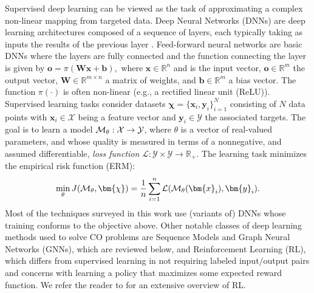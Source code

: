 Supervised deep learning can be viewed as the task of
approximating a complex non-linear mapping from targeted data. Deep
Neural Networks (DNNs) are deep learning architectures composed of a
sequence of layers, each typically taking as inputs the results of the previous layer . Feed-forward neural networks are basic DNNs where the layers are fully connected and the function connecting the layer is given by
\(
    \bm{o} = \pi(\bm{W} \bm{x} + \bm{b}),
\)
where $\bm{x} \!\in\! \mathbb{R}^n$ and is the input vector, 
$\bm{o} \!\in\! \mathbb{R}^m$ the output vector, $\bm{W} \!\in\! 
\mathbb{R}^{m \times n}$ a matrix of weights, and $\bm{b} \!\in\! 
\mathbb{R}^m$ a bias vector. The function $\pi(\cdot)$ is
often non-linear (e.g., a rectified linear unit (ReLU)).
Supervised learning tasks consider datasets $\bm{\chi}\!=\!\{\bm{x}_i, \bm{y}_i\}_{i=1}^N$ consisting of $N$ data points with $\bm{x}_i \in \mathcal{X}$ being a feature vector and $\bm{y}_i \in \mathcal{Y}$ the associated targets. The goal is to learn a model ${\cal M}_\theta : \mathcal{X} \to \mathcal{Y}$, where $\theta$ is a vector of real-valued parameters, and whose quality is measured in terms of a nonnegative, and assumed differentiable, \emph{loss function} $\mathcal{L}: \mathcal{Y} \times \mathcal{Y} \to \mathbb{R}_+$.  The learning task minimizes the empirical risk function (ERM):
\begin{equation}
\label{eq:erm}
    \min_\theta J({\cal M}_\theta, \bm{\chi}) = \frac{1}{n} \sum_{i=1}^n 
    \mathcal{L}({\cal M}_\theta(\bm{x}_i), \bm{y}_i).
\end{equation}
Most of the techniques surveyed in this work use (variants of) DNNs whose training conforms to the objective above. Other notable classes of deep learning methods used to solve CO problems are Sequence Models and Graph Neural Networks (GNNs), which are reviewed below, and 
Reinforcement Learning (RL), which differs from supervised learning in not requiring labeled input/output pairs and concerns with learning a policy that maximizes some expected reward function.  
We refer the reader to 
 for an extensive overview of RL.

